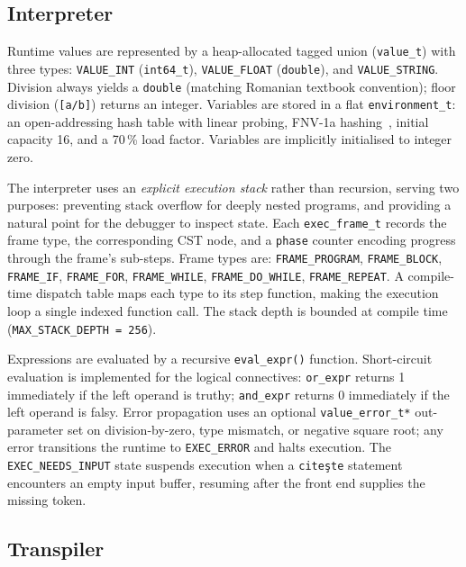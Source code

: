 \documentclass[conference]{IEEEtran}
\begin{document}
\subsection{Interpreter}

Runtime values are represented by a heap-allocated tagged union
(\texttt{value\_t}) with three types: \texttt{VALUE\_INT} (\texttt{int64\_t}),
\texttt{VALUE\_FLOAT} (\texttt{double}), and \texttt{VALUE\_STRING}.  Division
always yields a \texttt{double} (matching Romanian textbook convention);
floor division (\texttt{[a/b]}) returns an integer.  Variables are stored in a
flat \texttt{environment\_t}: an open-addressing hash table with linear
probing, FNV-1a hashing~\cite{fnv-hash}, initial capacity 16, and a 70\,\%
load factor.  Variables are implicitly initialised to integer zero.

The interpreter uses an \emph{explicit execution stack} rather than recursion,
serving two purposes: preventing stack overflow for deeply nested programs, and
providing a natural point for the debugger to inspect state.  Each
\texttt{exec\_frame\_t} records the frame type, the corresponding CST node,
and a \texttt{phase} counter encoding progress through the frame's sub-steps.
Frame types are: \texttt{FRAME\_PROGRAM}, \texttt{FRAME\_BLOCK},
\texttt{FRAME\_IF}, \texttt{FRAME\_FOR}, \texttt{FRAME\_WHILE},
\texttt{FRAME\_DO\_WHILE}, \texttt{FRAME\_REPEAT}.  A compile-time dispatch
table maps each type to its step function, making the execution loop a single
indexed function call.  The stack depth is bounded at compile time
(\texttt{MAX\_STACK\_DEPTH = 256}).

Expressions are evaluated by a recursive \texttt{eval\_expr()} function.
Short-circuit evaluation is implemented for the logical connectives:
\texttt{or\_expr} returns 1 immediately if the left operand is truthy;
\texttt{and\_expr} returns 0 immediately if the left operand is falsy.  Error
propagation uses an optional \texttt{value\_error\_t*} out-parameter set on
division-by-zero, type mismatch, or negative square root; any error
transitions the runtime to \texttt{EXEC\_ERROR} and halts execution.  The
\texttt{EXEC\_NEEDS\_INPUT} state suspends execution when a
\texttt{cite\c{s}te} statement encounters an empty input buffer, resuming after
the front end supplies the missing token.

\subsection{Transpiler}
\end{document}
